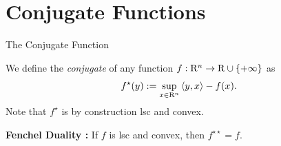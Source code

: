 \documentclass[9pt]{beamer}
\begin{document}
\section{Conjugate Functions}

\begin{frame}{The Conjugate Function}

  We define the \emph{conjugate} of any function $f:\mathrm{R}^n\to\mathrm{R}\cup\{+\infty\}$ as
  \[
    f^\star(y):= \sup_{x\in\mathrm{R}^n} \left<y, x\right>-f(x).
  \]
  Note that $f^\star$ is by construction \ac{lsc} and convex.

  \vfill

  \begin{center}
    
  \end{center}

  \vfill

  \textbf{Fenchel Duality :} If $f$ is \ac{lsc} and convex, then $f^{\star\star}=f$.
  
\end{frame}





  
\end{document}
